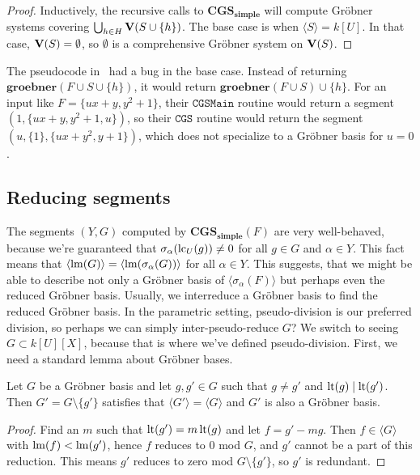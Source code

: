 \begin{proof}
  Inductively, the recursive calls to $\mathbf{CGS_{simple}}$ will compute Gröbner systems covering $\bigcup_{h \in H} \operatorname{\mathbf V}(S \cup \{h\})$. The base case is when $\langle S \rangle = k[U]$. In that case, $\operatorname{\mathbf V}(S) = \emptyset$, so $\emptyset$ is a comprehensive Gröbner system on $\operatorname{\mathbf V}(S)$.
\end{proof}

The pseudocode in~\cite{ss_algo} had a bug in the base case. Instead of returning $\mathbf{groebner}(F \cup S \cup \{h\})$, it would return $\mathbf{groebner}(F \cup S) \cup \{h\}$. For an input like $F = \{ux + y, y^{2} + 1\}$, their $\mathtt{CGSMain}$ routine would return a segment $(1, \{ux + y, y^{2} + 1, u\})$, so their $\mathtt{CGS}$ routine would return the segment $({u}, \{1\}, \{ux + y^{2}, y + 1\})$, which does not specialize to a Gröbner basis for $u = 0$.

\subsection{Reducing segments}
The segments $(Y, G)$ computed by $\mathbf{CGS_{simple}}(F)$ are very well-behaved, because we're guaranteed that $\sigma_{\alpha}(\operatorname{lc}_{U}(g)) \neq 0$ for all $g \in G$ and $\alpha \in Y$. This fact means that $\langle \operatorname{lm}(G) \rangle = \langle \operatorname{lm}(\sigma_{\alpha}(G)) \rangle$ for all $\alpha \in Y$. This suggests, that we might be able to describe not only a Gröbner basis of $\langle \sigma_{\alpha}(F) \rangle$ but perhaps even the reduced Gröbner basis. Usually, we interreduce a Gröbner basis to find the reduced Gröbner basis. In the parametric setting, pseudo-division is our preferred division, so perhaps we can simply inter-pseudo-reduce $G$? We switch to seeing $G \subset k[U][X]$, because that is where we've defined pseudo-division. First, we need a standard lemma about Gröbner bases.

\begin{lemma}\label{lem:redundant}
  Let $G$ be a Gröbner basis and let $g, g' \in G$ such that $g \neq g'$ and $\operatorname{lt}(g) \mid \operatorname{lt}(g')$. Then $G' = G \setminus \{g'\}$ satisfies that $\langle G' \rangle = \langle G \rangle$ and $G'$ is also a Gröbner basis.
\end{lemma}
\begin{proof}
  Find an $m$ such that $\operatorname{lt}(g') = m\operatorname{lt}(g)$ and let $f = g' - mg$. Then $f \in \langle G \rangle$ with $\operatorname{lm}(f) < \operatorname{lm}(g')$, hence $f$ reduces to 0 mod $G$, and $g'$ cannot be a part of this reduction. This means $g'$ reduces to zero mod $G \setminus \{g'\}$, so $g'$ is redundant.
\end{proof}

